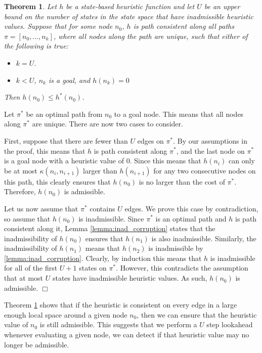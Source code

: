 \documentclass[letterpaper]{article}
\newtheorem{theorem}{Theorem}
\newenvironment{proof}{\par\noindent{\em Proof.}}{\hfill $\Box$\medskip}
\begin{document}
\begin{theorem}%
Let $h$ be a state-based heuristic function and let $U$ be an upper bound on the number of states in the state space that have inadmissible heuristic values. Suppose that for some node $n_0$, $h$ is path consistent along all paths $\pi=[n_0, ..., n_k]$, where all nodes along the path are unique, such that either of the following is true:
\begin{itemize}
    \item $k = U$.
    \item $k < U$, $n_k$ is a goal, and $h(n_k) = 0$
\end{itemize}
Then $h(n_0) \leq h^*(n_0)$.
\label{the:inadmissible-detection}
\end{theorem}
\begin{proof}
Let $\pi^*$ be an optimal path from $n_0$ to a goal node. This means that all nodes along $\pi^*$ are unique. There are now two cases to consider.

First, suppose that there are fewer than $U$ edges on $\pi^*$. By our assumptions in the proof, this means that $h$ is path consistent along $\pi^*$, and the last node on $\pi^*$ is a goal node with a heuristic value of $0$. Since this means that $h(n_i)$ can only be at most $\kappa(n_i, n_{i+1})$ larger than $h(n_{i+1})$ for any two consecutive nodes on this path, this clearly ensures that $h(n_0)$ is no larger than the cost of $\pi^*$. Therefore, $h(n_0)$ is admissible.

Let us now assume that $\pi^*$ contains $U$ edges. We prove this case by contradiction, so assume that $h(n_0)$ is inadmissible. Since $\pi^*$ is an optimal path and $h$ is path consistent along it, Lemma \ref{lemma:inad_corruption} states that the inadmissibility of $h(n_0)$ ensures that $h(n_1)$ is also inadmissible. Similarly, the inadmissibility of $h(n_1)$ means that $h(n_2)$ is inadmissible by \ref{lemma:inad_corruption}. Clearly, by induction this means that $h$ is inadmissible for all of the first $U+1$ states on $\pi^*$. However, this contradicts the assumption that at most $U$ states have inadmissible heuristic values. As such, $h(n_0)$ is admissible.
\end{proof}

Theorem \ref{the:inadmissible-detection} shows that if the heuristic is consistent on every edge in a large enough local space around a given node $n_0$, then we can ensure that the heuristic value of $n_0$ is still admissible. This suggests that we perform a $U$ step lookahead whenever evaluating a given node, we can detect if that heuristic value may no longer be admissible.
\end{document}

